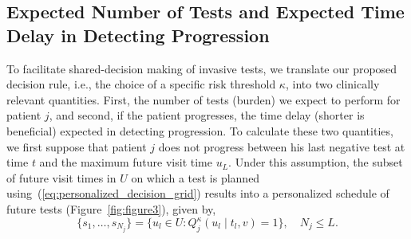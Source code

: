 \documentclass[AMA,STIX1COL]{WileyNJD-v2}
\begin{document}
\subsection{Expected Number of Tests and Expected Time Delay in Detecting Progression}
\label{subsec:exp_delay_estimation}
To facilitate shared-decision making of invasive tests, we translate our proposed decision rule, i.e., the choice of a specific risk threshold $\kappa$, into two clinically relevant quantities. First, the number of tests (burden) we expect to perform for patient $j$, and second, if the patient progresses, the time delay (shorter is beneficial) expected in detecting progression. To calculate these two quantities, we first suppose that patient $j$ does not progress between his last negative test at time $t$ and the maximum future visit time $u_L$. Under this assumption, the subset of future visit times in $U$ on which a test is planned using~(\ref{eq:personalized_decision_grid}) results into a personalized schedule of future tests (Figure~\ref{fig:figure3}), given by,
\begin{equation}
\label{eq:personalized_schedule_grid}
\{s_1, \ldots, s_{N_j}\} = \big\{ u_l \in U : Q_j^\kappa(u_l \mid t_l, v) = 1 \big\}, \quad N_j \leq L.
\end{equation}
\end{document}
